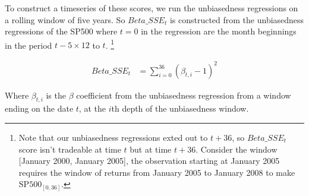 To construct a timeseries of these scores, we run the unbiasedness regressions on a rolling window of five years.
So $Beta\_SSE_t$ is constructed from the unbiasedness regressions of the SP500 where $t=0$ in the regression are the month beginnings in the period
$t - 5 \times 12$ to $t$.
\footnote{Note that our unbiasedness regressions exted out to $t+36$, so $Beta\_SSE_t$ score isn't tradeable at time $t$ but at time $t+36$. Consider the window [January 2000, January 2005], the observation starting at January 2005 requires the window of returns from January 2005 to January 2008 to make $\mathrm{SP500}_{[0, 36]}$.}

\begin{equation}
    \begin{aligned}
        Beta\_SSE_t &= \sum_{i=0}^{36} (\beta_{t,i} - 1)^2
    \end{aligned}
\end{equation}

Where $\beta_{t,i}$ is the $\beta$ coefficient from the unbiasedness regression from a 
window ending on the date $t$, at the $i$th depth of the unbiasedness window.
